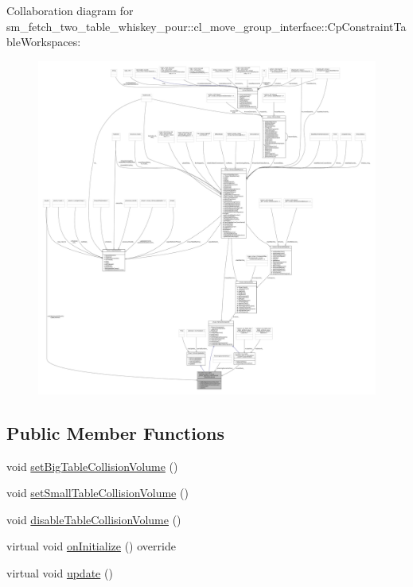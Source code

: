 Collaboration diagram for sm\+\_\+fetch\+\_\+two\+\_\+table\+\_\+whiskey\+\_\+pour\+:\+:cl\+\_\+move\+\_\+group\+\_\+interface\+:\+:Cp\+Constraint\+Table\+Workspaces\+:
\nopagebreak
\begin{figure}[H]
\begin{center}
\leavevmode
\includegraphics[width=350pt]{classsm__fetch__two__table__whiskey__pour_1_1cl__move__group__interface_1_1CpConstraintTableWorkspaces__coll__graph}
\end{center}
\end{figure}
\subsection*{Public Member Functions}
\begin{DoxyCompactItemize}
\item 
void \hyperlink{classsm__fetch__two__table__whiskey__pour_1_1cl__move__group__interface_1_1CpConstraintTableWorkspaces_afddc692582062ce054c0ba834ae76d0a}{set\+Big\+Table\+Collision\+Volume} ()
\item 
void \hyperlink{classsm__fetch__two__table__whiskey__pour_1_1cl__move__group__interface_1_1CpConstraintTableWorkspaces_aec8ff8ff7f564986dc02cc019c67a233}{set\+Small\+Table\+Collision\+Volume} ()
\item 
void \hyperlink{classsm__fetch__two__table__whiskey__pour_1_1cl__move__group__interface_1_1CpConstraintTableWorkspaces_aad2794eec4d7247bc8e5c984fcacc6a7}{disable\+Table\+Collision\+Volume} ()
\item 
virtual void \hyperlink{classsm__fetch__two__table__whiskey__pour_1_1cl__move__group__interface_1_1CpConstraintTableWorkspaces_a6d333c263396864c34db183ea530f73c}{on\+Initialize} () override
\item 
virtual void \hyperlink{classsm__fetch__two__table__whiskey__pour_1_1cl__move__group__interface_1_1CpConstraintTableWorkspaces_a7c8e7186aff561f2a1721145814add82}{update} ()
\end{DoxyCompactItemize}
